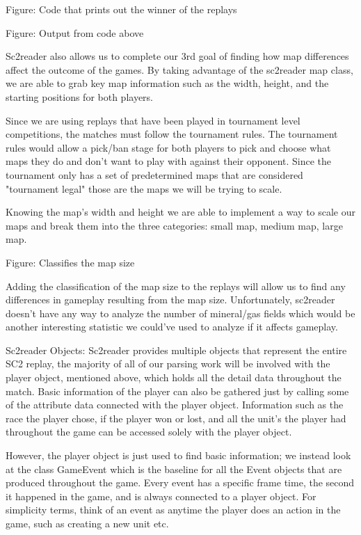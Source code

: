 \documentclass[a4paper,12pt]{report}
\begin{document}
Figure: Code that prints out the winner of the replays


Figure: Output from code above

Sc2reader also allows us to complete our 3rd goal of finding how map differences affect the outcome of the games. By taking advantage of the sc2reader map class, we are able to grab key map information such as the width, height, and the starting positions for both players.

Since we are using replays that have been played in tournament level competitions, the matches must follow the tournament rules. The tournament rules would allow a pick/ban stage for both players to pick and choose what maps they do and don’t want to play with against their opponent. Since the tournament only has a set of predetermined maps that are considered "tournament legal" those are the maps we will be trying to scale.

Knowing the map’s width and height we are able to implement a way to scale our maps and break them into the three categories: small map, medium map, large map.


Figure: Classifies the map size

Adding the classification of the map size to the replays will allow us to find any differences in gameplay resulting from the map size. Unfortunately, sc2reader doesn’t have any way to analyze the number of mineral/gas fields which would be another interesting statistic we could’ve used to analyze if it affects gameplay.


Sc2reader Objects:
Sc2reader provides multiple objects that represent the entire SC2 replay, the majority of all of our parsing work will be involved with the player object, mentioned above,  which holds all the detail data throughout the match. Basic information of the player can also be gathered just by calling some of the attribute data connected with the player object. Information such as the race the player chose, if the player won or lost, and all the unit’s the player had throughout the game can be accessed solely with the player object.

However, the player object is just used to find basic information; we instead look at the class GameEvent which is the baseline for all the Event objects that are produced throughout the game. Every event has a specific frame time, the second it happened in the game, and is always connected to a player object. For simplicity terms, think of an event as anytime the player does an action in the game, such as creating a new unit etc.
\end{document}
